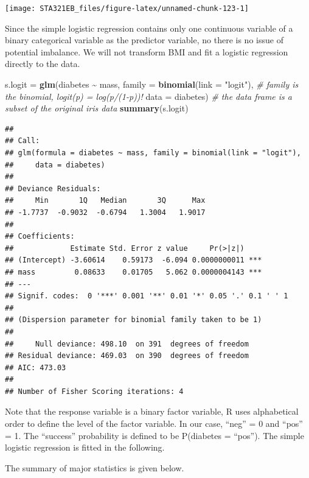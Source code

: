 \documentclass[
]{book}
\newenvironment{Shaded}{\begin{snugshade}}{\end{snugshade}}
\newcommand{\AttributeTok}[1]{\textcolor[rgb]{0.13,0.29,0.53}{#1}}
\newcommand{\CommentTok}[1]{\textcolor[rgb]{0.56,0.35,0.01}{\textit{#1}}}
\newcommand{\FunctionTok}[1]{\textcolor[rgb]{0.13,0.29,0.53}{\textbf{#1}}}
\newcommand{\NormalTok}[1]{#1}
\newcommand{\OtherTok}[1]{\textcolor[rgb]{0.56,0.35,0.01}{#1}}
\newcommand{\SpecialCharTok}[1]{\textcolor[rgb]{0.81,0.36,0.00}{\textbf{#1}}}
\newcommand{\StringTok}[1]{\textcolor[rgb]{0.31,0.60,0.02}{#1}}
\begin{document}
\begin{center}\texttt{[image: STA321EB\_files/figure-latex/unnamed-chunk-123-1]} \end{center}

Since the simple logistic regression contains only one continuous variable of a binary categorical variable as the predictor variable, no there is no issue of potential imbalance. We will not transform BMI and fit a logistic regression directly to the data.

\begin{Shaded}
\begin{Highlighting}[]
\NormalTok{s.logit }\OtherTok{=} \FunctionTok{glm}\NormalTok{(diabetes }\SpecialCharTok{\textasciitilde{}}\NormalTok{ mass, }
          \AttributeTok{family =} \FunctionTok{binomial}\NormalTok{(}\AttributeTok{link =} \StringTok{"logit"}\NormalTok{),  }\CommentTok{\# family is the binomial, logit(p) = log(p/(1{-}p))!}
          \AttributeTok{data =}\NormalTok{ diabetes)                    }\CommentTok{\# the data frame is a subset of the original iris data}
\FunctionTok{summary}\NormalTok{(s.logit)}
\end{Highlighting}
\end{Shaded}

\begin{verbatim}
## 
## Call:
## glm(formula = diabetes ~ mass, family = binomial(link = "logit"), 
##     data = diabetes)
## 
## Deviance Residuals: 
##     Min       1Q   Median       3Q      Max  
## -1.7737  -0.9032  -0.6794   1.3004   1.9017  
## 
## Coefficients:
##             Estimate Std. Error z value     Pr(>|z|)    
## (Intercept) -3.60614    0.59173  -6.094 0.0000000011 ***
## mass         0.08633    0.01705   5.062 0.0000004143 ***
## ---
## Signif. codes:  0 '***' 0.001 '**' 0.01 '*' 0.05 '.' 0.1 ' ' 1
## 
## (Dispersion parameter for binomial family taken to be 1)
## 
##     Null deviance: 498.10  on 391  degrees of freedom
## Residual deviance: 469.03  on 390  degrees of freedom
## AIC: 473.03
## 
## Number of Fisher Scoring iterations: 4
\end{verbatim}

Note that the response variable is a binary factor variable, R uses alphabetical order to define the level of the factor variable. In our case, ``neg'' = 0 and ``pos'' = 1. The ``success'' probability is defined to be P(diabetes = ``pos''). The simple logistic regression is fitted in the following.

The summary of major statistics is given below.
\end{document}
